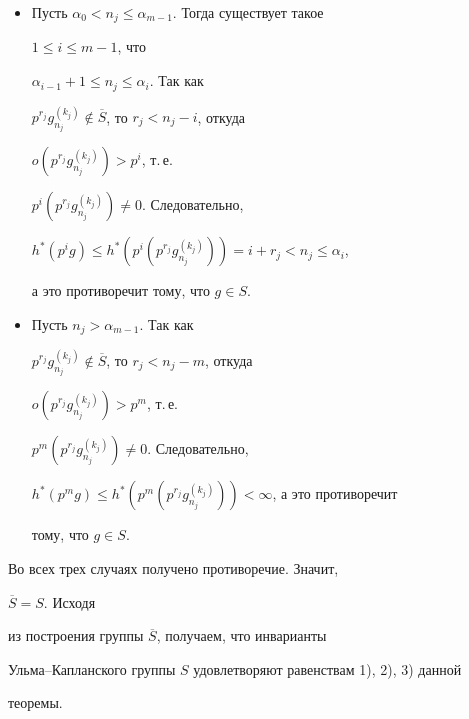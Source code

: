 \begin{pf}
\begin{itemize}
Тогда $h^*(p^{r_j}g_{n_j}^{(k_j)})<\alpha_0$,


откуда $h^*(g)<\alpha_0$, а это противоречит тому, что $g\in S$.


\item[2.] Пусть $\alpha_0<n_j\leq\alpha_{m-1}$. Тогда существует такое


$1\leq i\leq m-1$, что


$\alpha_{i-1}+1\leq n_j\leq \alpha_i$. Так как


$p^{r_j} g_{n_j}^{(k_j)}\notin\overline{S}$, то $r_j<n_j-i$, откуда


$o(p^{r_j} g_{n_j}^{(k_j)})>p^i$, т.\,е.\


$p^i(p^{r_j} g_{n_j}^{(k_j)})\neq 0$. Следовательно,


$h^*(p^ig)\leq h^*(p^i(p^{r_j} g_{n_j}^{(k_j)}))=i+r_j<n_j\leq\alpha_i$,


а это противоречит тому, что $g\in S$.


\item[3.] Пусть $n_j>\alpha_{m-1}$. Так как


$p^{r_j} g_{n_j}^{(k_j)}\notin\overline{S}$, то $r_j<n_j-m$, откуда


$o(p^{r_j} g_{n_j}^{(k_j)})>p^m$, т.\,е.\


$p^m(p^{r_j} g_{n_j}^{(k_j)})\neq 0$. Следовательно,


$h^*(p^mg)\leq h^*(p^m(p^{r_j} g_{n_j}^{(k_j)}))<\infty$, а это противоречит


тому, что $g\in S$.


\end{itemize}


Во всех трех случаях получено противоречие. Значит,


$\overline{S}=S$. Исходя


из построения группы $\overline{S}$, получаем, что инварианты


Ульма--Капланского группы $S$ удовлетворяют равенствам 1), 2), 3) данной


теоремы.


\end{pf}





